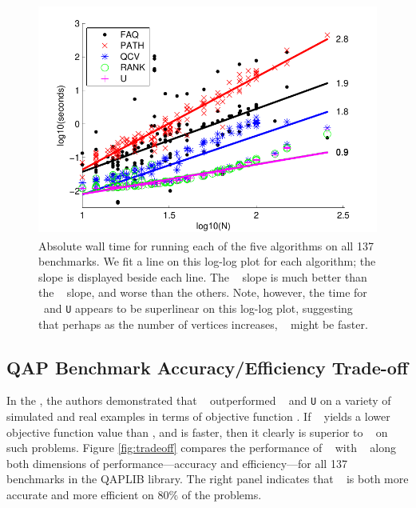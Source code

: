\documentclass[preprint,11pt]{elsarticle}
\begin{document}
\begin{figure}[htbp]
	\centering
		\includegraphics[height=3in]{../figs/allEfficiency.pdf}
	\caption{Absolute wall time for running each of the five algorithms on all 137 benchmarks. We fit a line on this log-log plot for each algorithm; the slope is displayed beside each line. The \FAQ~ slope is much better than the \Path~ slope, and worse than the others.  Note, however, the time for \Rank~and \texttt{U} appears to be superlinear on this log-log plot, suggesting that perhaps as the number of vertices increases, \Path~ might be faster. }
	\label{fig:allEfficiency}
\end{figure}



\subsection{QAP Benchmark Accuracy/Efficiency Trade-off} %
\label{sub:tradeoff}


In the \Path, the authors demonstrated that \Path~ outperformed \Qcv~ and \texttt{U} on a variety of simulated and real examples in terms of objective function \cite{Zaslavskiy2009}.  If \FAQ~ yields a lower objective function value than \FAQ, and is faster, then it clearly is superior to \Path~ on such problems.  Figure \ref{fig:tradeoff} compares the performance of \FAQ~ with \Path~ along both dimensions of performance---accuracy and efficiency---for all 137 benchmarks in the QAPLIB library.  The right panel indicates that \FAQ~ is both more accurate and more efficient on $80\%$ of the problems.
\end{document}
